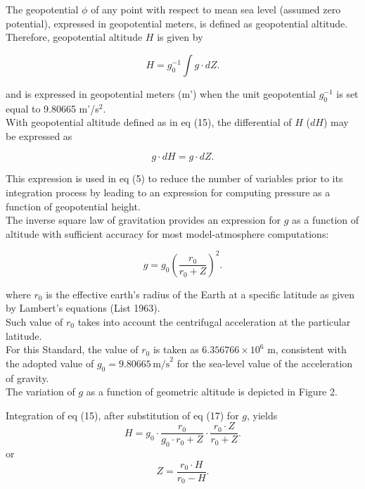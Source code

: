 \documentclass{article}
\begin{document}
The geopotential $\phi$ of any point with respect to mean sea level (assumed zero potential), expressed in geopotential meters, is defined as geopotential altitude. \\
Therefore, geopotential altitude $H$ is given by

\begin{equation}
 H = g_0^{-1} \int g \cdot dZ. \tag{15}
\end{equation}

and is expressed in geopotential meters (m') when the unit geopotential $g_0^{-1}$ is set equal to 9.80665 m'/s$^2$. \\

With geopotential altitude defined as in eq (15), the differential of $H$ ($dH$) may be expressed as

\begin{equation}
 g\cdot dH = g\cdot dZ. \tag{16}
\end{equation}

This expression is used in eq (5) to reduce the number of variables prior to its integration process by leading to an expression for computing pressure as a function of geopotential height. \\

The inverse square law of gravitation provides an expression for $g$ as a function of altitude with sufficient accuracy for most model-atmosphere computations:

\begin{equation}
 g = g_0 \left( \frac{r_0}{r_0 + Z} \right)^2. \tag{17}
\end{equation}

where $r_0$ is the effective earth's radius of the Earth at a specific latitude as given by Lambert's equations (List 1963). \\
Such value of $r_0$ takes into account the centrifugal acceleration at the particular latitude. \\
For this Standard, the value of $r_0$ is taken as $6.356766 \times 10^6$ m, consistent with the adopted value of $g_0 = 9.80665 \, \text{m/s}^2$ for the sea-level value of the acceleration of gravity. \\
The variation of $g$ as a function of geometric altitude is depicted in Figure 2.


Integration of eq (15), after substitution of eq (17) for $g$, yields
\begin{equation}
 H = g_0 \cdot \frac{r_0}{g_0 \cdot r_0 + Z} \cdot \frac{r_0 \cdot Z}{r_0 + Z}. \tag{18}
\end{equation}
or
\begin{equation}
 Z = \frac{r_0 \cdot H}{r_0 - H}. \tag{19}
\end{equation}
\end{document}
